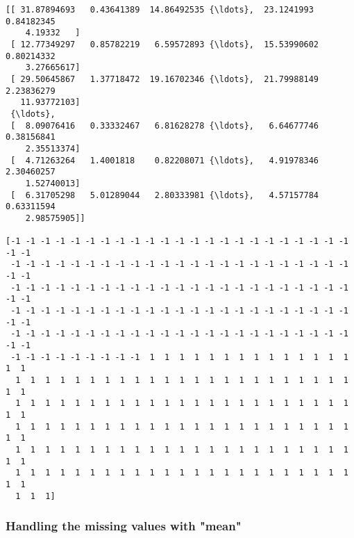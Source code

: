 \documentclass[11pt]{article}
\begin{document}
    \begin{Verbatim}[commandchars=\\\{\}]
[[ 31.87894693   0.43641389  14.86492535 {\ldots},  23.1241993    0.84182345
    4.19332   ]
 [ 12.77349297   0.85782219   6.59572893 {\ldots},  15.53990602   0.80214332
    3.27665617]
 [ 29.50645867   1.37718472  19.16702346 {\ldots},  21.79988149   2.23836279
   11.93772103]
 {\ldots}, 
 [  8.09076416   0.33332467   6.81628278 {\ldots},   6.64677746   0.38156841
    2.35513374]
 [  4.71263264   1.4001818    0.82208071 {\ldots},   4.91978346   2.30460257
    1.52740013]
 [  6.31705298   5.01289044   2.80333981 {\ldots},   4.57157784   0.63311594
    2.98575905]]

[-1 -1 -1 -1 -1 -1 -1 -1 -1 -1 -1 -1 -1 -1 -1 -1 -1 -1 -1 -1 -1 -1 -1 -1 -1
 -1 -1 -1 -1 -1 -1 -1 -1 -1 -1 -1 -1 -1 -1 -1 -1 -1 -1 -1 -1 -1 -1 -1 -1 -1
 -1 -1 -1 -1 -1 -1 -1 -1 -1 -1 -1 -1 -1 -1 -1 -1 -1 -1 -1 -1 -1 -1 -1 -1 -1
 -1 -1 -1 -1 -1 -1 -1 -1 -1 -1 -1 -1 -1 -1 -1 -1 -1 -1 -1 -1 -1 -1 -1 -1 -1
 -1 -1 -1 -1 -1 -1 -1 -1 -1 -1 -1 -1 -1 -1 -1 -1 -1 -1 -1 -1 -1 -1 -1 -1 -1
 -1 -1 -1 -1 -1 -1 -1 -1 -1  1  1  1  1  1  1  1  1  1  1  1  1  1  1  1  1
  1  1  1  1  1  1  1  1  1  1  1  1  1  1  1  1  1  1  1  1  1  1  1  1  1
  1  1  1  1  1  1  1  1  1  1  1  1  1  1  1  1  1  1  1  1  1  1  1  1  1
  1  1  1  1  1  1  1  1  1  1  1  1  1  1  1  1  1  1  1  1  1  1  1  1  1
  1  1  1  1  1  1  1  1  1  1  1  1  1  1  1  1  1  1  1  1  1  1  1  1  1
  1  1  1  1  1  1  1  1  1  1  1  1  1  1  1  1  1  1  1  1  1  1  1  1  1
  1  1  1]

    \end{Verbatim}

    \subsubsection{Handling the missing values with
"mean"}\label{handling-the-missing-values-with-mean}
\end{document}
